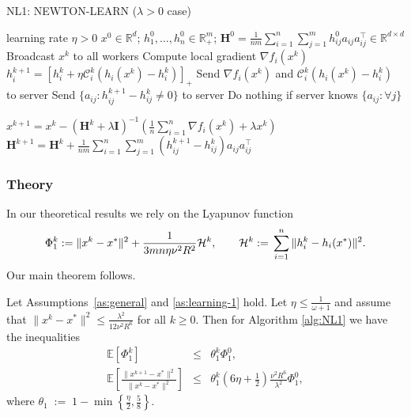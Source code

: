 \documentclass[10pt]{article}
\newcommand{\squeeze}{}
\newcommand{\eqdef}{\; { := }\;}
\newcommand{\R}{\mathbb{R}}
\newcommand{\newalpha}{h}
\newcommand{\mH}{\mathbf{H}}
\newcommand{\mI}{\mathbf{I}}
\newcommand{\cC}{{\mathcal{C}}}
\begin{document}
\begin{algorithm}[tb]
	\caption{{\sf NL1: NEWTON-LEARN} ($\lambda>0$ case)}
	\label{alg:NL1}
\begin{algorithmic}
		 learning rate $\eta>0$ 
		$x^0 \in \R^d$; $h^0_1,\dots, h^0_n \in \R^{m}_{+}$; $\mH^0 =  \frac{1}{nm} \sum \limits_{i=1}^n  \sum\limits_{j=1}^{m} h_{ij}^0 a_{ij}a_{ij}^\top\in \R^{d\times d}$
		\STATE Broadcast $x^k$ to all workers
		\STATE Compute local gradient $\nabla f_i(x^k)$ 
		\STATE $h^{k+1}_i = [h^k_i + \eta \cC_i^k (\newalpha_i(x^k) - h^k_i)]_+$ 
		\STATE Send $\nabla f_i(x^k)$ and $\cC_i^k (\newalpha_i(x^k) - h^k_i)$ to server 
		 Send $\{a_{ij} : h_{ij}^{k+1} - h_{ij}^k \neq 0\}$ to server
		 Do nothing if server knows $\{a_{ij} : \forall j\}$
		\ENDFOR
		
		\STATE $x^{k+1} = x^k - \left( \mH^k + \lambda \mI \right)^{-1} \left(  \frac{1}{n} \sum\limits_{i=1}^n \nabla f_i(x^k) + \lambda x^k  \right)$
		\STATE $\mH^{k+1} = \mH^k + \frac{1}{nm} \sum \limits_{i=1}^n  \sum\limits_{j=1}^{m} (h_{ij}^{k+1} - h_{ij}^k) a_{ij}a_{ij}^\top $
		\ENDFOR
\end{algorithmic}
\end{algorithm} 

\subsubsection{Theory}

In our theoretical results we rely on the Lyapunov function 
$$
\squeeze \Phi_1^k \eqdef \|x^{k} - x^*\|^2 + \frac{1}{3mn\eta  \nu^2 R^2} {\cal H}^{k}, \qquad {\cal H}^k \eqdef \sum_{i=1}^n \|h_i^k - \newalpha_i(x^*)\|^2. 
$$ Our main theorem follows.

\begin{theorem}[Convergence of {\sf NL1}]\label{th:lambda>0}
Let  Assumptions~\ref{as:general} and  \ref{as:learning-1} hold. Let $\eta\leq \frac{1}{\omega+1}$ and assume that $\|x^k - x^*\|^2 \leq \frac{\lambda^2}{12\nu^2R^6}$ for all $k\geq 0$. Then for Algorithm \ref{alg:NL1} we have the inequalities 
\begin{eqnarray*}
\squeeze
\mathbb{E}[\Phi_1^k] & \leq & \theta_1^k \Phi_1^0,\\
\squeeze  
\mathbb{E} \left[  \frac{\|x^{k+1} - x^*\|^2}{\|x^k - x^*\|^2 }  \right] & \leq &\theta_1^k  \left(  {6\eta} + \frac{1}{2}  \right) \frac{\nu^2 R^6}{\lambda^2} \Phi_1^0, 
\end{eqnarray*}
where $\theta_1 \eqdef    1 - \min \left\{  \frac{\eta}{2}, \frac{5}{8}  \right\} $.
\end{theorem}
\end{document}

